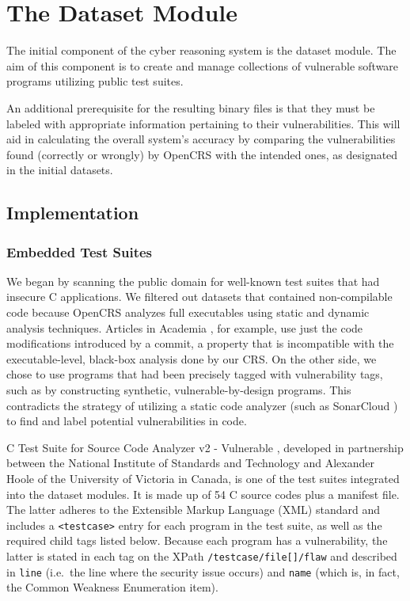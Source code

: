 \documentclass[../main.tex]{subfiles}
\begin{document}
\hypertarget{dataset-module}{%
\chapter{The Dataset Module}\label{dataset-module}}

The initial component of the cyber reasoning system is the dataset
module. The aim of this component is to create and manage collections of
vulnerable software programs utilizing public test suites.

An additional prerequisite for the resulting binary files is that they
must be labeled with appropriate information pertaining to their
vulnerabilities. This will aid in calculating the overall system's
accuracy by comparing the vulnerabilities found (correctly or wrongly)
by OpenCRS with the intended ones, as designated in the initial
datasets.

\hypertarget{implementation}{%
\section{Implementation}\label{implementation}}

\hypertarget{embedded-test-suites}{%
\subsection{Embedded Test Suites}\label{embedded-test-suites}}

We began by scanning the public domain for well-known test suites that
had insecure C applications. We filtered out datasets that contained
non-compilable code because OpenCRS analyzes full executables using
static and dynamic analysis techniques. Articles in Academia \cite{c_code_changes_dataset}, for
example, use just the code modifications introduced by a commit, a
property that is incompatible with the executable-level, black-box
analysis done by our CRS. On the other side, we chose to use programs
that had been precisely tagged with vulnerability tags, such as by
constructing synthetic, vulnerable-by-design programs. This contradicts
the strategy of utilizing a static code analyzer (such as SonarCloud \cite{sonarcloud_dataset}) to
find and label potential vulnerabilities in code.

C Test Suite for Source Code Analyzer v2 - Vulnerable \cite{nist_c_test_suite}, developed in
partnership between the National Institute of Standards and Technology
and Alexander Hoole of the University of Victoria in Canada, is one of
the test suites integrated into the dataset modules. It is made up of 54
C source codes plus a manifest file. The latter adheres to the Extensible Markup Language (XML)
standard and includes a \texttt{\textless{}testcase\textgreater{}} entry
for each program in the test suite, as well as the required child tags
listed below. Because each program has a vulnerability, the latter is
stated in each tag on the XPath \texttt{/testcase/file{[}{]}/flaw} and
described in \texttt{line} (i.e.~the line where the security issue
occurs) and \texttt{name} (which is, in fact, the Common Weakness
Enumeration item).
\end{document}
